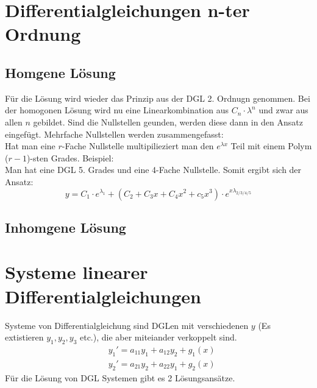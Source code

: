 \documentclass[a4paper,10pt]{scrartcl}
\begin{document}
        \section{Differentialgleichungen n-ter Ordnung}
        \subsection*{Homgene Lösung}
        Für die Lösung wird wieder das Prinzip aus der DGL 2. Ordnugn genommen. Bei der homogonen Lösung wird nu eine Linearkombination aus \(C_n \cdot \lambda^n \) und 
        zwar aus allen \(n\) gebildet. Sind die Nullstellen geunden, werden diese dann in den Ansatz eingefügt. Mehrfache Nullstellen werden zusammengefasst: \\
        Hat man eine \(r\)-Fache Nullstelle multipilieziert man den \(e^{\lambda x}\) Teil mit einem Polym (\(r-1\))-sten Grades. Beispiel: \\
        Man hat eine DGL 5. Grades und eine 4-Fache Nullstelle. Somit ergibt sich der Ansatz: 
        \begin{equation}
            y = C_1 \cdot e^{\lambda_1} + (C_2 + C_3x + C_4x^2 + c_5x^3) \cdot e^{x \lambda_{2/3/4/5}}
        \end{equation}   

        \subsection*{Inhomgene Lösung}

        \section{Systeme linearer Differentialgleichungen}
        Systeme von Differentialgleichung sind DGLen mit verschiedenen \(y\) (Es extistieren  \(y_1, y_2, y_3\) etc.), die aber miteiander verkoppelt sind.
        \begin{equation*}
            \begin{aligned}
                & y_1' = a_{11}y_1 + a_{12}y_2 + g_1(x) \\
                & y_2' = a_{21}y_2 + a_{22}y_1 + g_2(x)  
            \end{aligned}
        \end{equation*}
        Für die Lösung von DGL Systemen gibt es 2 Lösungsansätze.
\end{document}
